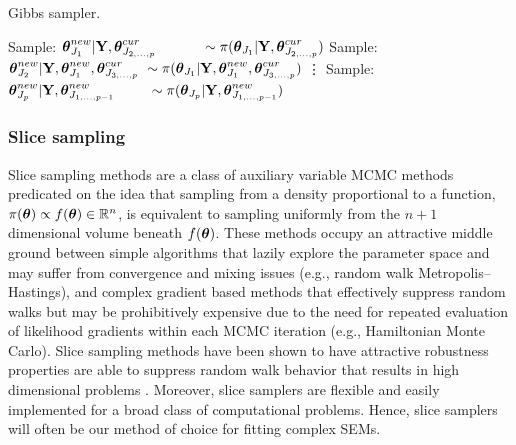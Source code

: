 \begin{algorithm}[htbp]
	\caption{Gibbs sampler.}
	\label{alg:gibbs}
	\begin{algorithmic}[1]
			\State Sample: $ \boldsymbol{\theta}^{new}_{J_1}|\mathbf{Y},\boldsymbol{\theta}^{cur}_{J_{2,\dots,p}}\hspace{0.45in} \sim\pi(\boldsymbol{\theta}_{J_1}|\mathbf{Y},\boldsymbol{\theta}^{cur}_{J_{2,\dots,p}}) $
			\State Sample: $ \btheta^{new}_{J_2}|\bY,\btheta^{new}_{J_1},\btheta^{cur}_{J_{3,\dots,p}}\ \sim\pi(\btheta_{J_1}|\bY,\btheta^{new}_{J_1},\btheta^{cur}_{J_{3,\dots,p}}) $
			\State \hspace{0.2in} \vdots
			\State Sample: $ \boldsymbol{\theta}^{new}_{J_p}|\mathbf{Y},\boldsymbol{\theta}_{J_{1,\dots,p-1}}^{new} \hspace{0.33in} \sim \pi(\boldsymbol{\theta}_{J_p}|\mathbf{Y},\boldsymbol{\theta}_{J_{1,\dots,p-1}}^{new}) $
		\EndFor
		\EndProcedure
	\end{algorithmic}
\end{algorithm}

\subsubsection{Slice sampling}
\label{subsubsec:slice_sampling}

Slice sampling methods are a class of auxiliary variable MCMC methods predicated on the idea that sampling from a density proportional to a function, $ \pi(\boldsymbol{\theta})\propto f(\boldsymbol{\theta}) \in \mathbb{R}^n $, is equivalent to sampling uniformly from the $ n+1 $ dimensional volume beneath $ f(\boldsymbol{\theta}) $. These methods occupy an attractive middle ground between simple algorithms that lazily explore the parameter space and may suffer from convergence and mixing issues (e.g., random walk Metropolis--Hastings), and complex gradient based methods that effectively suppress random walks but may be prohibitively expensive due to the need for repeated evaluation of likelihood gradients within each MCMC iteration (e.g., Hamiltonian Monte Carlo). Slice sampling methods have been shown to have attractive robustness properties are able to suppress random walk behavior that results in high dimensional problems \cite{mira2002efficiency,roberts1999convergence,neal2003slice}. Moreover, slice samplers are flexible and easily implemented for a broad class of computational problems. Hence, slice samplers will often be our method of choice for fitting complex SEMs. 

